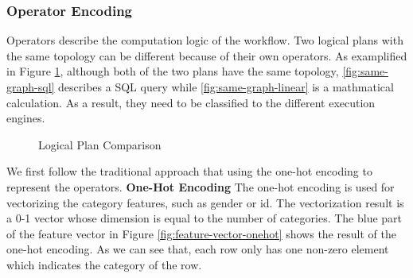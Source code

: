 \subsubsection{Operator Encoding}
Operators describe the computation logic of the workflow.
Two logical plans with the same topology can be different because of their own operators.
As examplified in Figure \ref{fig:graph-comparison}, although both of the two plans have the same topology,
\ref{fig:same-graph-sql} describes a SQL query while \ref{fig:same-graph-linear} is a mathmatical calculation.
As a result, they need to be classified to the different execution engines.

\begin{figure}
  \caption{Logical Plan Comparison}
  \label{fig:graph-comparison}
\end{figure}

We first follow the traditional approach that using the one-hot encoding to represent the operators.
\textbf{One-Hot Encoding}
The one-hot encoding is used for vectorizing the category features, such as gender or id. 
The vectorization result is a 0-1 vector whose dimension is equal to the number of categories.
The blue part of the feature vector in Figure \ref{fig:feature-vector-onehot} shows the result of the one-hot encoding. 
As we can see that, each row only has one non-zero element which indicates the category of the row.

